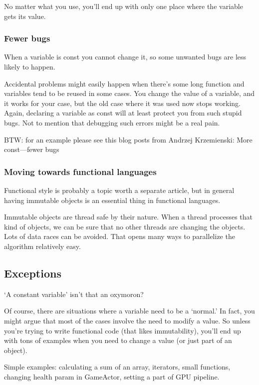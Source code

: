 No matter what you use, you’ll end up with only one place where the variable gets its value.

\subsubsection{Fewer bugs}

When a variable is const you cannot change it, so some unwanted bugs are less likely to happen.

Accidental problems might easily happen when there’s some long function and variables tend to be reused in some cases. You change the value of a variable, and it works for your case, but the old case where it was used now stops working. Again, declaring a variable as const will at least protect you from such stupid bugs. Not to mention that debugging such errors might be a real pain.

BTW: for an example please see this blog posts from Andrzej Krzemienski: More const---fewer bugs

\subsubsection{Moving towards functional languages}

Functional style is probably a topic worth a separate article, but in general having immutable objects is an essential thing in functional languages. 

Immutable objects are thread safe by their nature. When a thread processes that kind of objects, we can be sure that no other threads are changing the objects. Lots of data races can be avoided. That opens many ways to parallelize the algorithm relatively easy. 


\subsection{Exceptions}

‘A constant variable’ isn’t that an oxymoron?

Of course, there are situations where a variable need to be a ‘normal.’ In fact, you might argue that most of the cases involve the need to modify a value. So unless you’re trying to write functional code (that likes immutability), you’ll end up with tons of examples when you need to change a value (or just part of an object).

Simple examples: calculating a sum of an array, iterators, small functions, changing health param in GameActor, setting a part of GPU pipeline.

